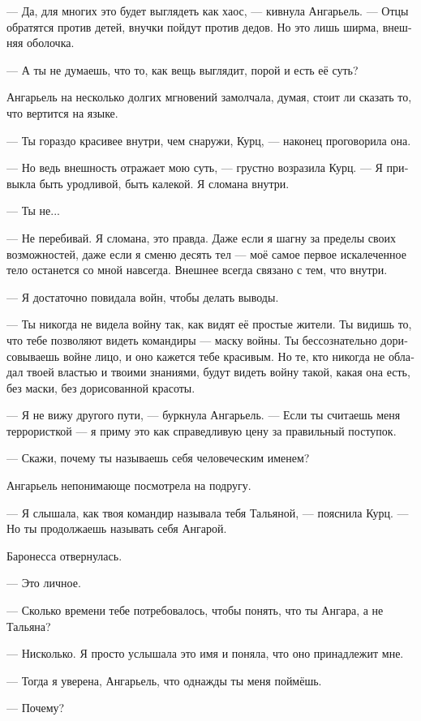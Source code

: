 \documentclass[a4paper,12pt,fleqn]{book}\usepackage{polyglossia}\setdefaultlanguage[babelshorthands=true]{russian}\setotherlanguage{english}\defaultfontfeatures{Ligatures=TeX,Mapping=tex-text}\usepackage{xcolor}\newcommand{\ml}[3]{#2}
\begin{document}
--- Да, для многих это будет выглядеть как хаос, --- кивнула Ангарьель.
--- Отцы обратятся против детей, внучки пойдут против дедов.
Но это лишь ширма, внешняя оболочка.

--- А ты не думаешь, что то, как вещь выглядит, порой и есть её суть?

Ангарьель на несколько долгих мгновений замолчала, думая, стоит ли сказать то, что вертится на языке.

--- Ты гораздо красивее внутри, чем снаружи, Курц, --- наконец проговорила она.

--- Но ведь внешность отражает мою суть, --- грустно возразила Курц.
--- Я привыкла быть уродливой, быть калекой.
Я сломана внутри.

--- Ты не...

--- Не перебивай.
Я сломана, это правда.
Даже если я шагну за пределы своих возможностей, даже если я сменю десять тел --- моё самое первое искалеченное тело останется со мной навсегда.
Внешнее всегда связано с тем, что внутри.

--- Я достаточно повидала войн, чтобы делать выводы.

--- Ты никогда не видела войну так, как видят её простые жители.
Ты видишь то, что тебе позволяют видеть командиры --- маску войны.
Ты бессознательно дорисовываешь войне лицо, и оно кажется тебе красивым.
Но те, кто никогда не обладал твоей властью и твоими знаниями, будут видеть войну такой, какая она есть, без маски, без дорисованной красоты.

--- Я не вижу другого пути, --- буркнула Ангарьель.
--- Если ты считаешь меня террористкой --- я приму это как справедливую цену за правильный поступок.

--- Скажи, почему ты называешь себя человеческим именем?

Ангарьель непонимающе посмотрела на подругу.

--- Я слышала, как твоя командир называла тебя Тальяной, --- пояснила Курц.
--- Но ты продолжаешь называть себя Ангарой.

Баронесса отвернулась.

--- Это личное.

--- Сколько времени тебе потребовалось, чтобы понять, что ты Ангара, а не Тальяна?

--- Нисколько.
Я просто услышала это имя и поняла, что оно принадлежит мне.

--- Тогда я уверена, Ангарьель, что однажды ты меня поймёшь.

--- Почему?
\end{document}
